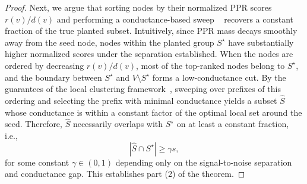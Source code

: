 \documentclass[11pt,english]{article}
\begin{document}
\begin{proof}
\vspace{3mm}
\noindent Next, we argue that sorting nodes by their normalized PPR scores $r(v)/d(v)$ and performing a conductance-based sweep ~\parencite{andersen2006local} recovers a constant fraction of the true planted subset. Intuitively, since PPR mass decays smoothly away from the seed node, nodes within the planted group $S^\star$ have substantially higher normalized scores under the separation established. When the nodes are ordered by decreasing $r(v)/d(v)$, most of the top-ranked nodes belong to $S^\star$, and the boundary between $S^\star$ and $V\setminus S^\star$ forms a low-conductance cut.
By the guarantees of the local clustering framework~\parencite{andersen2006local}, sweeping over prefixes of this ordering and selecting the prefix with minimal conductance yields a subset $\widehat S$ whose conductance is within a constant factor of the optimal local set around the seed. Therefore, $\widehat S$ necessarily overlaps with $S^\star$ on at least a constant fraction, i.e.,
\[
    |\widehat S \cap S^\star| \ge \gamma s,
\]
for some constant $\gamma \in (0,1)$ depending only on the signal-to-noise separation and conductance gap. This establishes part (2) of the theorem.


\end{proof}
\end{document}
